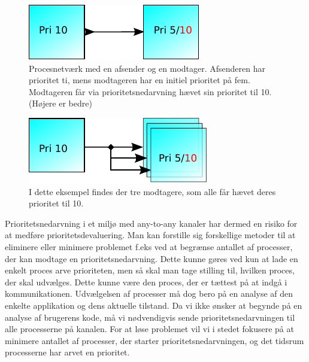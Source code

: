 \begin{figure}
 \begin{center}
  \includegraphics[scale=1.00]{images/one-to-one-inheritance}
\caption{Procesnetværk med en afsender og en modtager. Afsenderen har prioritet ti, mens modtageren har en initiel prioritet på fem. Modtageren  får via prioritetsnedarvning hævet sin prioritet til 10. (Højere er bedre)}
  \label{fig:one-to-one-inheritance}
  \end{center}
\end{figure}

\begin{figure}
 \begin{center}
  \includegraphics[scale=1.00]{images/any-to-any-inheritance}
  \caption{I dette eksempel findes der tre modtagere, som alle får hævet deres prioritet til 10.}
  \label{fig:any-to-any-inheritance}
  \end{center}
\end{figure}

 Prioritetsnedarvning i et miljø med any-to-any kanaler har dermed en risiko for at medføre prioritetsdevaluering. Man kan forstille sig forskellige metoder til at eliminere eller minimere problemet f.eks ved at begrænse antallet af processer, der kan modtage en prioritetsnedarvning. Dette kunne gøres ved kun at lade en enkelt proces arve prioriteten,  men så skal man tage stilling til, hvilken proces, der skal udvælges. Dette kunne være den proces, der er tættest på at indgå i kommunikationen.  Udvælgelsen af processer må dog bero på en analyse af den enkelte applikation og dens aktuelle tilstand. Da vi ikke ønsker at begynde på en analyse af brugerens kode, må vi nødvendigvis sende prioritetsnedarvningen til alle processerne på kanalen. For at løse problemet vil vi i stedet fokusere på at minimere antallet af processer, der starter prioritetsnedarvningen, og det tidsrum processerne har arvet en prioritet.

